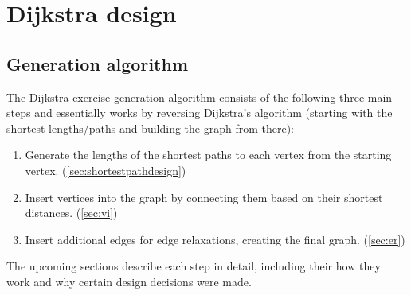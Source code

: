 \documentclass{l4proj}
\begin{document}

\chapter{Dijkstra design}

\section{Generation algorithm}
\label{sec:dgen}

The Dijkstra exercise generation algorithm consists of the following three main steps and essentially works by reversing Dijkstra's algorithm (starting with the shortest lengths/paths and building the graph from there):

\begin{enumerate}
	\item
	Generate the lengths of the shortest paths to each vertex from the starting vertex. (\autoref{sec:shortestpathdesign})
	\item
	Insert vertices into the graph by connecting them based on their shortest distances. (\autoref{sec:vi})
	\item
	Insert additional edges for edge relaxations, creating the final graph. (\autoref{sec:er})
\end{enumerate}

The upcoming sections describe each step in detail, including their how they work and why certain design decisions were made. 
\end{document}
